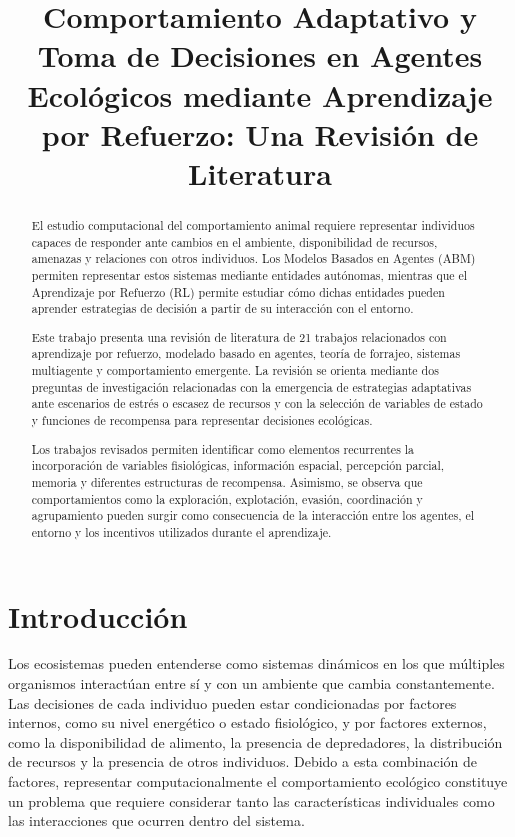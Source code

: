 \documentclass[conference]{IEEEtran}
\title{Comportamiento Adaptativo y Toma de Decisiones en Agentes Ecológicos mediante Aprendizaje por Refuerzo: Una Revisión de Literatura}
\author{
\IEEEauthorblockN{Axel López Vega}
\and
\IEEEauthorblockN{Kevin Núñez Camacho}
\and
\IEEEauthorblockN{Felipe Murillo}
}
\begin{document}
\maketitle


\begin{abstract}

El estudio computacional del comportamiento animal requiere representar
individuos capaces de responder ante cambios en el ambiente, disponibilidad
de recursos, amenazas y relaciones con otros individuos. Los Modelos
Basados en Agentes (ABM) permiten representar estos sistemas mediante
entidades autónomas, mientras que el Aprendizaje por Refuerzo (RL) permite
estudiar cómo dichas entidades pueden aprender estrategias de decisión a
partir de su interacción con el entorno.

Este trabajo presenta una revisión de literatura de 21 trabajos
relacionados con aprendizaje por refuerzo, modelado basado en agentes,
teoría de forrajeo, sistemas multiagente y comportamiento emergente. La
revisión se orienta mediante dos preguntas de investigación relacionadas
con la emergencia de estrategias adaptativas ante escenarios de estrés o
escasez de recursos y con la selección de variables de estado y funciones
de recompensa para representar decisiones ecológicas.

Los trabajos revisados permiten identificar como elementos recurrentes la
incorporación de variables fisiológicas, información espacial, percepción
parcial, memoria y diferentes estructuras de recompensa. Asimismo, se
observa que comportamientos como la exploración, explotación, evasión,
coordinación y agrupamiento pueden surgir como consecuencia de la
interacción entre los agentes, el entorno y los incentivos utilizados
durante el aprendizaje.

\end{abstract}


\section{Introducción}

Los ecosistemas pueden entenderse como sistemas dinámicos en los que
múltiples organismos interactúan entre sí y con un ambiente que cambia
constantemente. Las decisiones de cada individuo pueden estar
condicionadas por factores internos, como su nivel energético o estado
fisiológico, y por factores externos, como la disponibilidad de alimento,
la presencia de depredadores, la distribución de recursos y la presencia
de otros individuos. Debido a esta combinación de factores, representar
computacionalmente el comportamiento ecológico constituye un problema que
requiere considerar tanto las características individuales como las
interacciones que ocurren dentro del sistema.
\end{document}

